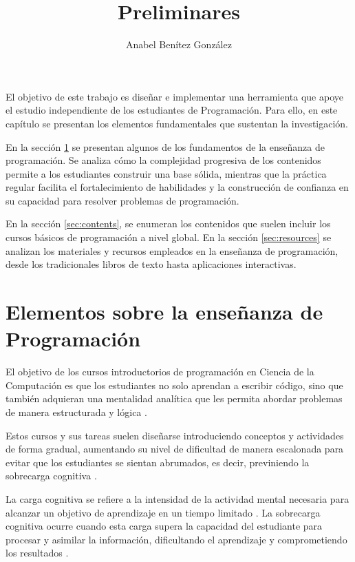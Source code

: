 \documentclass{article}
\title{Preliminares}
\author{Anabel Benítez González}
\date{}
\begin{document}
\tableofcontents 

\maketitle

El objetivo de este trabajo es diseñar e implementar una herramienta que apoye el estudio independiente de los estudiantes de Programación. Para ello, en este capítulo se presentan los elementos fundamentales que sustentan la investigación.

En la sección \ref{sec:ensenanza_programacion} se presentan algunos de los fundamentos de la enseñanza de programación. Se analiza cómo la complejidad progresiva de los contenidos permite a los estudiantes construir una base sólida, mientras que la práctica regular facilita el fortalecimiento de habilidades y la construcción de confianza en su capacidad para resolver problemas de programación.

En la sección \ref{sec:contents}, se enumeran los contenidos que suelen incluir los cursos básicos de programación a nivel global. En la sección \ref{sec:resources} se analizan los materiales y recursos empleados en la enseñanza de programación, desde los tradicionales libros de texto hasta aplicaciones interactivas.

\section{Elementos sobre la enseñanza de Programación}
\label{sec:ensenanza_programacion}

El objetivo de los cursos introductorios de programación en Ciencia de la Computación es que los estudiantes no solo aprendan a escribir código, sino que también adquieran una mentalidad analítica que les permita abordar problemas de manera estructurada y lógica \cite{JOHNLEMAY2021100056}. 


Estos cursos y sus tareas suelen diseñarse introduciendo conceptos y actividades de forma gradual, aumentando su nivel de dificultad de manera escalonada para evitar que los estudiantes se sientan abrumados, es decir, previniendo la sobrecarga cognitiva \cite{duran2021clt}.

La carga cognitiva se refiere a la intensidad de la actividad mental necesaria para alcanzar un objetivo de aprendizaje en un tiempo limitado \cite{duran2021clt}. La sobrecarga cognitiva ocurre cuando esta carga supera la capacidad del estudiante para procesar y asimilar la información, dificultando el aprendizaje y comprometiendo los resultados \cite{duran2021clt}. 
\end{document}
